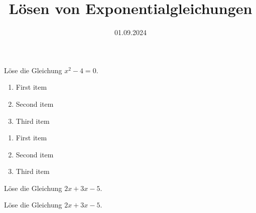 \documentclass[points=left, 
solution,
textsize=14pt,
mathsize=16pt,
boxoffset=0.67cm
]{exam}
\date{01.09.2024}
\title{Lösen von Exponentialgleichungen}
\begin{document}
Löse die Gleichung \(x^2 - 4 = 0\). \\
\begin{enumerate}
    \item First item
    \item Second item
    \item Third item
\end{enumerate}
\begin{enumerate}[label=\alph*)]
    \item First item
    \item Second item
    \item Third item
\end{enumerate}

\lipsum[1]

Löse die Gleichung \(2x + 3x - 5\).

Löse die Gleichung \(2x + 3x - 5\).
\thinkbubble[Test]


\totalpoints
\end{document}
